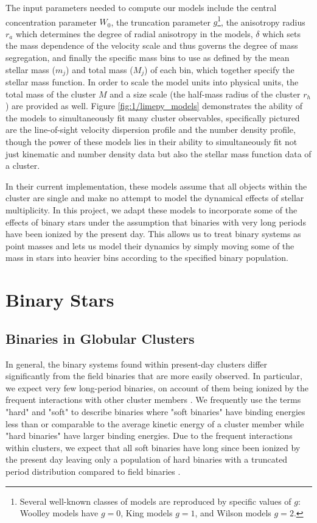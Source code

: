 The input parameters needed to compute our models include the central concentration parameter $W_0$,
the truncation parameter $g$\footnote{Several well-known classes of models are reproduced by
	specific values of $g$: Woolley models \citep{Woolley1954} have $g=0$, King models \citep{King1966}
	$g=1$, and Wilson models \citep{Wilson1975} $g=2$.}, the anisotropy radius $r_a$ which determines
the degree of radial anisotropy in the models, $\delta$ which sets the mass dependence of the
velocity scale and thus governs the degree of mass segregation, and finally the specific mass bins
to use as defined by the mean stellar mass ($m_j$) and total mass ($M_j$) of each bin, which
together specify the stellar mass function. In order to scale the model units into physical units,
the total mass of the cluster $M$ and a size scale (the half-mass radius of the cluster $r_h$) are
provided as well. Figure \ref{fig:1/limepy_models} demonstrates the ability of the models to
simultaneously fit many cluster observables, specifically pictured are the line-of-sight velocity
dispersion profile and the number density profile, though the power of these models lies in their
ability to simultaneously fit not just kinematic and number density data but also the stellar mass
function data of a cluster.


In their current implementation, these models assume that all objects within the cluster are single
and make no attempt to model the dynamical effects of stellar multiplicity. In this project, we
adapt these models to incorporate some of the effects of binary stars under the assumption that
binaries with very long periods have been ionized by the present day. This allows us to treat binary
systems as point masses and lets us model their dynamics by simply moving some of the mass in stars
into heavier bins according to the specified binary population.



\section{Binary Stars}
\subsection{Binaries in Globular Clusters}


In general, the binary systems found within present-day clusters differ significantly from the field
binaries that are more easily observed. In particular, we expect very few long-period binaries, on
account of them being ionized by the frequent interactions with other cluster members
\citep{Heggie2003}. We frequently use the terms "hard" and "soft" to describe binaries where "soft
binaries" have binding energies less than or comparable to the average kinetic energy of a cluster
member while "hard binaries" have larger binding energies. Due to the frequent interactions within
clusters, we expect that all soft binaries have long since been ionized by the present day leaving
only a population of hard binaries with a truncated period distribution compared to field binaries
\citep{Heggie2003}.





